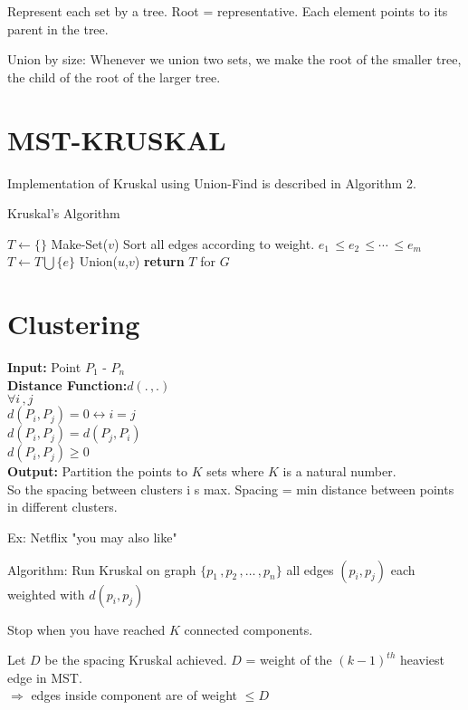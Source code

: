 \documentclass{article}
\theoremstyle{definition}
\theoremstyle{remark}
\theoremstyle{plain}
\begin{document}
Represent each set by a tree.  Root = representative.  Each element points to its parent in the tree.

Union by size: Whenever we union two sets, we make the root of the smaller tree, the child of the root of the larger tree.

\section{MST-KRUSKAL}
Implementation of Kruskal using Union-Find is described in Algorithm 2.

\begin{algorithm}
\caption{Kruskal's Algorithm}\label{Kruskal's Algorithm using Union-Find}
\begin{algorithmic}[1]
	\State $T \gets \{\}$
		\State Make-Set($v$)
	\EndFor
	\State Sort all edges according to weight. $e_1\, \leq e_2\, \leq \cdots \, \leq e_m$	
			\State $T \gets T \bigcup \{e\}$
			\State Union($u$,$v$)
		\EndIf
	\EndFor
	\State \textbf{return} $T$ for $G$
\EndProcedure
\end{algorithmic}
\end{algorithm}

\section{Clustering}

\textbf{Input:} Point $P_1$ - $P_n$\\
\textbf{Distance Function:}$d (.\,,.)$\\
$\forall i\,,j$\\
$ d(P_i,P_j) = 0 \leftrightarrow i = j $\\
$ d(P_i, P_j) = d(P_j, P_i)$\\
$ d(P_i, P_j) \ge 0$\\
\textbf{Output:} Partition the points to $K$ sets where $K$ is a natural number.\\
So the spacing between clusters i s max.  Spacing = min distance between points in different clusters.

Ex: Netflix "you may also like"

Algorithm: Run Kruskal on graph 
$\{p_1\,, p_2\,, \ldots \,,p_n\}$ all edges $(p_i,p_j)$ each weighted with $d(p_i,p_j)$

Stop when you have reached $K$ connected components.

Let $D$ be the spacing Kruskal achieved. $D$ = weight of the $(k-1)^{th}$ heaviest edge in MST.\\
$\Rightarrow$ edges inside component are of weight $\leq D$
\end{document}
